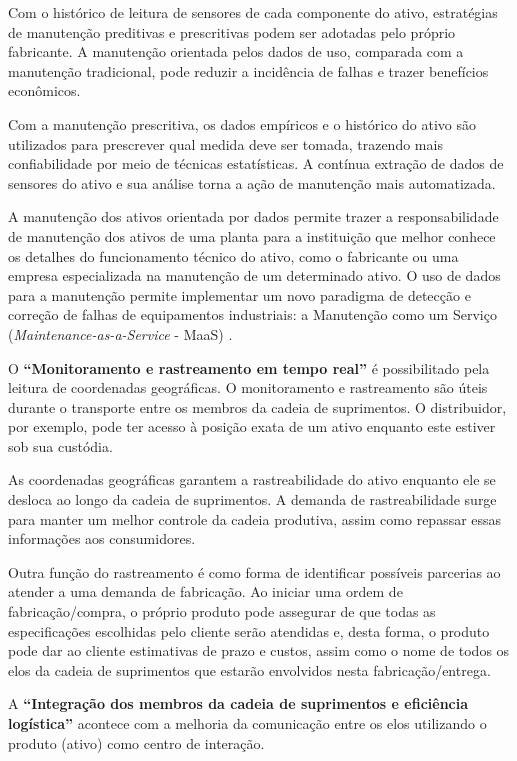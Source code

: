 Com o histórico de leitura de sensores de cada componente do ativo, estratégias de manutenção preditivas e prescritivas podem ser adotadas pelo próprio fabricante. A manutenção orientada pelos dados de uso, comparada com a manutenção tradicional, pode reduzir a incidência de falhas e trazer benefícios econômicos. %

Com a manutenção prescritiva, os dados empíricos e o histórico do ativo são utilizados para prescrever qual medida deve ser tomada, trazendo mais confiabilidade por meio de técnicas estatísticas. A contínua extração de dados de sensores do ativo e sua análise torna a ação de manutenção mais automatizada.

A manutenção dos ativos orientada por dados permite trazer a responsabilidade de manutenção dos ativos de uma planta para a instituição que melhor conhece os detalhes do funcionamento técnico do ativo, como o fabricante ou uma empresa especializada na manutenção de um determinado ativo. O uso de dados para a manutenção permite implementar um novo paradigma de detecção e correção de falhas de equipamentos industriais: a Manutenção como um Serviço (\textit{Maintenance-as-a-Service} - MaaS) \cite{zoll2018maas}.

O \textbf{``Monitoramento e rastreamento em tempo real''} é possibilitado pela leitura de coordenadas geográficas. O monitoramento e rastreamento são úteis durante o transporte entre os membros da cadeia de suprimentos. O distribuidor, por exemplo, pode ter acesso à posição exata de um ativo enquanto este estiver sob sua custódia.

As coordenadas geográficas garantem a rastreabilidade do ativo enquanto ele se desloca ao longo da cadeia de suprimentos. A demanda de rastreabilidade surge para manter um melhor controle da cadeia produtiva, assim como repassar essas informações aos consumidores.

Outra função do rastreamento é como forma de identificar possíveis parcerias ao atender a uma demanda de fabricação. Ao iniciar uma ordem de fabricação/compra, o próprio produto pode assegurar de que todas as especificações escolhidas pelo cliente serão atendidas e, desta forma, o produto pode dar ao cliente estimativas de prazo e custos, assim como o nome de todos os elos da cadeia de suprimentos que estarão envolvidos nesta fabricação/entrega.

A \textbf{``Integração dos membros da cadeia de suprimentos e eficiência logística''} acontece com a melhoria da comunicação entre os elos utilizando o produto (ativo) como centro de interação.

